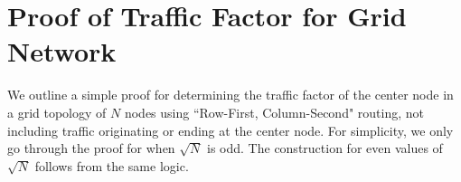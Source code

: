 %
%
%
%



\section{Proof of Traffic Factor for Grid Network}
\label{sec:grid_tf_proof}
We outline a simple proof for determining the traffic factor of the center node in a grid topology of $N$ nodes using ``Row-First, Column-Second" routing, not including traffic originating or ending at the center node.  For simplicity, we only go through the proof for when $\sqrt{N}$ is odd.  The construction for even values of $\sqrt{N}$ follows from the same logic.

